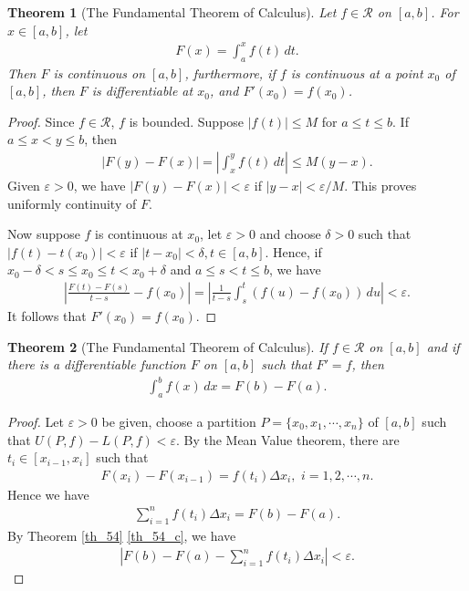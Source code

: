 \documentclass[11pt]{book}
\newtheorem{theorem}{Theorem}[chapter]
\theoremstyle{definition}
\numberwithin{equation}{chapter}
\begin{document}
\begin{theorem}[The Fundamental Theorem of Calculus]
Let $f \in \mathscr{R}$ on $[a,b]$. For $x \in [a,b]$, let
\begin{align*}
    F(x) = \int^x_a f(t) \,dt.
\end{align*}
Then $F$ is continuous on $[a,b]$, furthermore, if $f$ is continuous at a point $x_0$ of $[a,b]$, then $F$ is differentiable at $x_0$, and $F'(x_0) = f(x_0)$.
\end{theorem}
\begin{proof}
Since $f \in \mathscr{R}$, $f$ is bounded. Suppose $\left|f(t)\right| \leq M$ for $a \leq t \leq b$. If $a \leq x < y \leq b$, then
\begin{align*}
    \left|F(y) - F(x)\right| = \left|\int^y_x f(t) \,dt\right| \leq M(y - x).
\end{align*}
Given $\varepsilon > 0$, we have $\left|F(y) - F(x)\right| < \varepsilon$ if $\left|y - x\right| < \varepsilon/M$. This proves uniformly continuity of $F$.

Now suppose $f$ is continuous at $x_0$, let $\varepsilon > 0$ and choose $\delta > 0$ such that $\left|f(t) - t(x_0)\right| < \varepsilon$ if $\left|t - x_0\right| < \delta, t \in [a,b]$. Hence, if $x_0 - \delta < s \leq x_0 \leq t < x_0 + \delta$ and $a \leq s < t \leq b$, we have
\begin{align*}
    \left|\frac{F(t) - F(s)}{t - s} - f(x_0)\right| = \left|\frac{1}{t - s} \int^t_s (f(u) - f(x_0)) \,du \right| < \varepsilon.
\end{align*}
It follows that $F'(x_0) = f(x_0)$.
\end{proof}

\medskip

\begin{theorem}[The Fundamental Theorem of Calculus]\label{th_516}
If $f \in \mathscr{R}$ on $[a,b]$ and if there is a differentiable function $F$ on $[a,b]$ such that $F' = f$, then
\begin{align*}
    \int^b_a f(x) \,dx = F(b) - F(a).
\end{align*}
\end{theorem}
\begin{proof}
Let $\varepsilon > 0$ be given, choose a partition $P = \{x_0,x_1,\cdots,x_n\}$ of $[a,b]$ such that $U(P,f) - L(P,f) < \varepsilon$. By the Mean Value theorem, there are $t_i \in [x_{i-1},x_i]$ such that 
\begin{align*}
    F(x_i) - F(x_{i-1}) = f(t_i) \Delta x_i, \,\, i = 1,2,\cdots,n.
\end{align*}
Hence we have 
\begin{align*}
    \sum^n_{i=1} f(t_i) \Delta x_i = F(b) - F(a).
\end{align*}
By Theorem \ref{th_54} \ref{th_54_c}, we have
\begin{align*}
    \left|F(b) - F(a) - \sum^n_{i=1} f(t_i) \Delta x_i \right| < \varepsilon.
\end{align*}
\end{proof}
\end{document}
